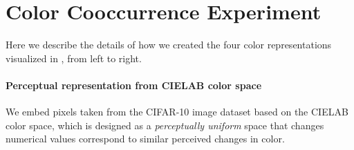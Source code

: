 





\section{Color Cooccurrence Experiment}
\label{sec:color_cooccurrences}

Here we describe the details of how we created the four color representations visualized in , from left to right.

\paragraph{Perceptual representation from CIELAB color space} We embed pixels taken from the CIFAR-10 image dataset \citep{krizhevsky2009learning,torralba200880} based on the CIELAB color space, which is designed as a \emph{perceptually uniform} space that changes numerical values correspond to similar perceived changes in color.

